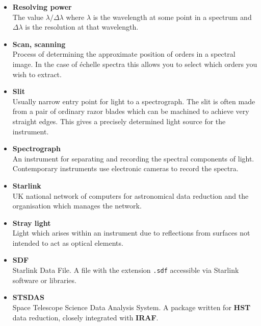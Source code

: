 \documentclass[twoside,11pt]{article}
\newcommand{\htmlref}[2]{#1}
\begin{document}
\begin{itemize}
\item {\bf\label{gl_resolving_power}Resolving power}\\
      The value $\lambda/\Delta\lambda$ where $\lambda$ is the wavelength
      at some point in a spectrum and $\Delta\lambda$ is the resolution
      at that wavelength.

\item {\bf\label{gl_scanning}Scan, scanning}\\
      Process of determining the approximate position of orders in a
      spectral image.  In the case of \'{e}chelle spectra this allows
      you to select which orders you wish to extract.

\item {\bf\label{gl_slit}Slit}\\
      Usually narrow entry point for light to a spectrograph.
      The slit is often made from a pair of ordinary razor blades which can
      be machined to achieve very straight edges.  This gives a precisely
      determined light source for the instrument.

\item {\bf\label{gl_spectrograph}Spectrograph}\\
      An instrument for separating and recording the spectral components of
      light.  Contemporary instruments use electronic cameras to record the
      spectra.

\item {\bf\label{gl_starlink}Starlink}\\
      UK national network of computers for astronomical data reduction
      and the organisation which manages the network.

\item {\bf\label{gl_stray_light}Stray light}\\
      Light which arises within an instrument due to reflections from
      surfaces not intended to act as optical elements.

\item {\bf\label{gl_sdf}SDF}\\
      Starlink Data File.  A file with the extension \verb+.sdf+
      accessible via Starlink software or libraries.

\item {\bf\label{gl_stsdas}STSDAS}\\
      Space Telescope Science Data Analysis System.  A package written
      for \htmlref{{\bf HST}}{gl_hst} data reduction, closely integrated
      with \htmlref{{\bf IRAF}}{gl_iraf}.


\end{itemize}
\end{document}
